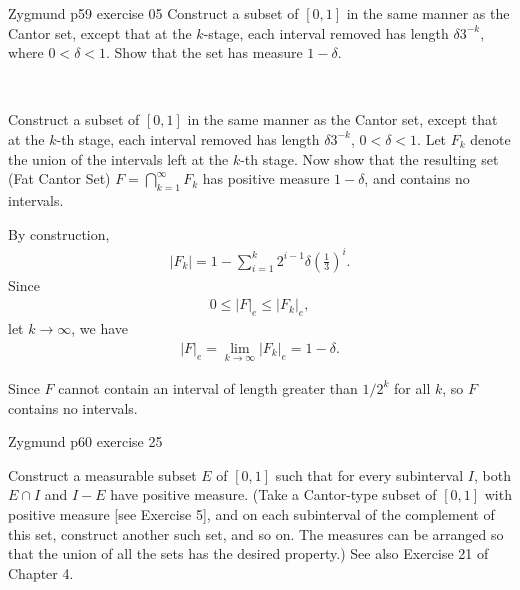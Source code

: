 \documentclass[UTF8,a4paper,10pt]{article}
\begin{document}
  \begin{Problem}[]{Zygmund p59 exercise 05}
    Construct a subset of $[0, 1]$ in the same manner as the Cantor set, except that at the $k$-stage, each interval removed has length $\delta3^{-k}$, where $0 < \delta < 1$. Show that the set has measure $1 - \delta$.


 
  \end{Problem}

  
\begin{solution}\,

  Construct a subset of \([0, 1]\) in the same manner as the Cantor set, except that at the \(k\)-th stage, each interval removed has length \(\delta 3^{-k}\), \(0 < \delta < 1\). Let \(F_k\) denote the union of the intervals left at the \(k\)-th stage.
  Now show that the resulting set (Fat Cantor Set) \(F = \bigcap_{k=1}^{\infty} F_k \) has positive measure \(1 - \delta\), and contains no intervals.
  
  By construction,
  \begin{equation*}
    \begin{aligned}
      |F_k| = 1 - \sum_{i=1}^{k} 2^{i-1}\delta(\frac{1}{3})^i.
    \end{aligned}
  \end{equation*}
  Since
  \begin{equation*}
    \begin{aligned}
      0\leq|F|_e\leq|F_k|_e,
    \end{aligned}
  \end{equation*}
  let \(k\to \infty\), we have 
  \begin{equation*}
    \begin{aligned}
      |F|_e = \lim_{k \to \infty}|F_k|_e = 1-\delta  .
    \end{aligned}
  \end{equation*}
  
  Since \(F\) cannot contain an interval of length greater than \(1/2^k\) for all \(k\), so \(F\) contains no intervals. 
  


\end{solution}

  
\begin{Problem}[]{Zygmund p60 exercise 25}

  Construct a measurable subset \(E\) of \([0, 1]\) such that for every subinterval \(I\), both \(E \cap  I\) and \(I - E\) have positive measure. (Take a Cantor-type subset of \([0, 1]\) with positive measure [see Exercise 5], and on each subinterval of the complement of this set, construct another such set, and so on. The measures can be arranged so that the union of all the sets has the desired property.) See also Exercise 21 of Chapter 4.

\end{Problem}
\end{document}
